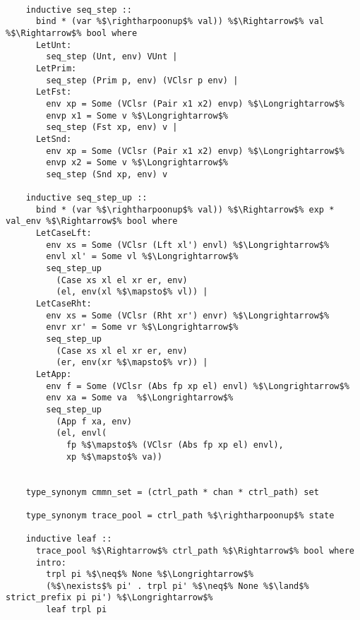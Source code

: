 \documentclass{article}
\begin{document}
  \begin{lstlisting}[style=codestyle1, escapechar=\%]

    inductive seq_step ::
      bind * (var %$\rightharpoonup$% val)) %$\Rightarrow$% val %$\Rightarrow$% bool where
      LetUnt: 
        seq_step (Unt, env) VUnt |
      LetPrim:
        seq_step (Prim p, env) (VClsr p env) |
      LetFst:
        env xp = Some (VClsr (Pair x1 x2) envp) %$\Longrightarrow$%
        envp x1 = Some v %$\Longrightarrow$% 
        seq_step (Fst xp, env) v |
      LetSnd: 
        env xp = Some (VClsr (Pair x1 x2) envp) %$\Longrightarrow$%  
        envp x2 = Some v %$\Longrightarrow$% 
        seq_step (Snd xp, env) v

    inductive seq_step_up ::
      bind * (var %$\rightharpoonup$% val)) %$\Rightarrow$% exp * val_env %$\Rightarrow$% bool where 
      LetCaseLft:
        env xs = Some (VClsr (Lft xl') envl) %$\Longrightarrow$%
        envl xl' = Some vl %$\Longrightarrow$%
        seq_step_up
          (Case xs xl el xr er, env)
          (el, env(xl %$\mapsto$% vl)) |
      LetCaseRht: 
        env xs = Some (VClsr (Rht xr') envr) %$\Longrightarrow$% 
        envr xr' = Some vr %$\Longrightarrow$%
        seq_step_up
          (Case xs xl el xr er, env)
          (er, env(xr %$\mapsto$% vr)) |
      LetApp:
        env f = Some (VClsr (Abs fp xp el) envl) %$\Longrightarrow$% 
        env xa = Some va  %$\Longrightarrow$% 
        seq_step_up
          (App f xa, env)
          (el, envl(
            fp %$\mapsto$% (VClsr (Abs fp xp el) envl),
            xp %$\mapsto$% va))


    type_synonym cmmn_set = (ctrl_path * chan * ctrl_path) set

    type_synonym trace_pool = ctrl_path %$\rightharpoonup$% state

    inductive leaf ::
      trace_pool %$\Rightarrow$% ctrl_path %$\Rightarrow$% bool where
      intro:
        trpl pi %$\neq$% None %$\Longrightarrow$% 
        (%$\nexists$% pi' . trpl pi' %$\neq$% None %$\land$% strict_prefix pi pi') %$\Longrightarrow$%  
        leaf trpl pi


\end{lstlisting}
\end{document}
